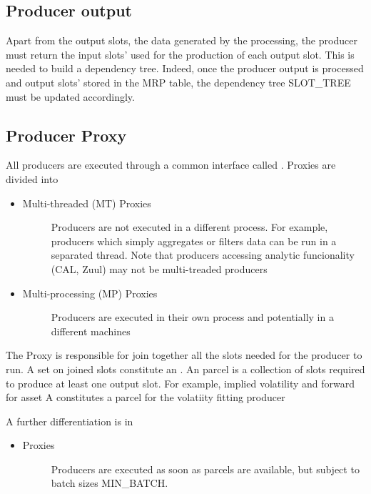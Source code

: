 \documentclass[letterpaper,10pt,english]{sphinxmanual}
\begin{document}
\subsection{Producer output}
\label{\detokenize{slot_prod:producer-output}}
Apart from the output slots, the data generated by the processing, the producer
must return the input slots’ used for the production of each output slot.
This is needed to build a dependency tree. Indeed, once the producer output is
processed and output slots’ stored in the MRP table, the dependency tree
SLOT\_TREE must be updated accordingly.


\subsection{Producer Proxy}
\label{\detokenize{slot_prod:producer-proxy}}
All producers are executed through a common interface called .
Proxies are divided into
\begin{itemize}
\item {} \begin{description}
\item[{Multi-threaded (MT) Proxies}] \leavevmode
Producers are not executed in a different process. For example, producers
which simply aggregates or filters data can be run in a separated thread.
Note that producers accessing analytic funcionality (CAL, Zuul) may not be
multi-treaded producers

\end{description}

\item {} \begin{description}
\item[{Multi-processing (MP) Proxies}] \leavevmode
Producers are executed in their own process and potentially in a different
machines

\end{description}

\end{itemize}

The Proxy is responsible for join together all the slots needed for the producer to run.
A set on joined slots constitute an .
An parcel is a collection of slots required to produce at least one output slot. For example, implied volatility and forward for asset A constitutes a parcel for the volatiity fitting producer

A further differentiation is in
\begin{itemize}
\item {} \begin{description}
\item[{ Proxies}] \leavevmode
Producers are executed as soon as parcels are available, but subject to batch
sizes MIN\_BATCH.

\end{description}

\end{itemize}
\end{document}
